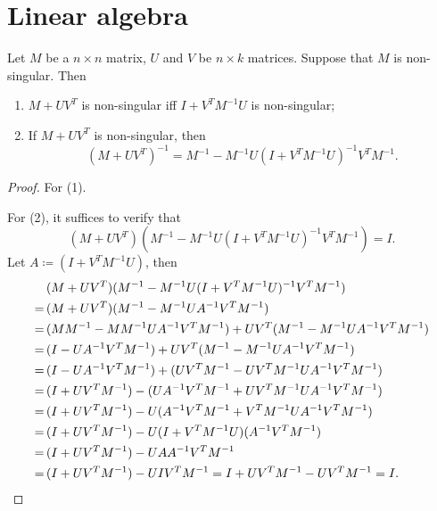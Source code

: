 \section{Linear algebra}
\label{sec:linear_algebra}

\begin{definition}[Rings]

\end{definition}

\begin{definition}[Fields]

\end{definition}

\begin{theorem}
    Let \(M\) be a \(n \times n\) matrix, \(U\) and \(V\) be \(n \times k\) matrices.
    Suppose that \(M\) is non-singular. 
    Then
    \begin{enumerate}[label = (\arabic*)]
        \item \(M + UV^T\) is non-singular iff \(I + V^TM^{-1}U\) is non-singular;
        \item If \(M + UV^T\) is non-singular, then
        \[
            (M + UV^T)^{-1} = M^{-1} - M^{-1}U(I + V^TM^{-1}U)^{-1}V^TM^{-1}.
        \]
    \end{enumerate}
\end{theorem}

\begin{proof}
    For (1).

    For (2), it suffices to verify that 
    \[
        (M + UV^T)(M^{-1} - M^{-1}U(I + V^TM^{-1}U)^{-1}V^TM^{-1}) = I.
    \]
    Let \(A \coloneqq (I + V^TM^{-1}U)\), then
    \begin{align*}
        &(M + UV^T)(M^{-1} - M^{-1}U(I + V^TM^{-1}U)^{-1}V^TM^{-1})\\
        = \, &(M + UV^T)(M^{-1} - M^{-1}UA^{-1}V^TM^{-1})\\
        = \, &(MM^{-1} - MM^{-1}UA^{-1}V^TM^{-1}) + UV^T(M^{-1} - M^{-1}UA^{-1}V^TM^{-1}) \\
        = \, &(I - UA^{-1}V^TM^{-1}) + UV^T(M^{-1} - M^{-1}UA^{-1}V^TM^{-1}) \\
        = \, &(I - UA^{-1}V^TM^{-1}) + (UV^TM^{-1} - UV^TM^{-1}UA^{-1}V^TM^{-1}) \\
        = \, &(I + UV^TM^{-1}) - (UA^{-1}V^TM^{-1} + UV^TM^{-1}UA^{-1}V^TM^{-1}) \\
        = \, &(I + UV^TM^{-1}) - U(A^{-1}V^TM^{-1} + V^TM^{-1}UA^{-1}V^TM^{-1}) \\
        = \, &(I + UV^TM^{-1}) - U(I + V^TM^{-1}U)(A^{-1}V^TM^{-1}) \\
        = \, &(I + UV^TM^{-1}) - UAA^{-1}V^TM^{-1} \\
        = \, &(I + UV^TM^{-1}) - UIV^TM^{-1} =  I + UV^TM^{-1} - UV^TM^{-1} = I. \qedhere \\
    \end{align*}
\end{proof}

